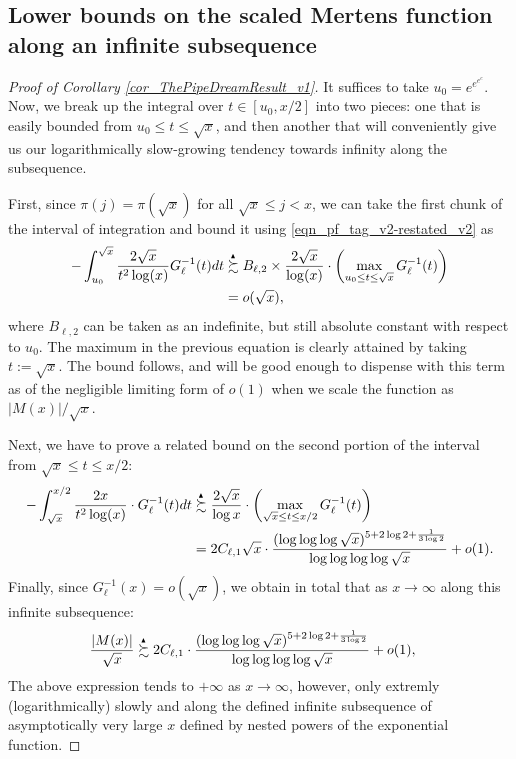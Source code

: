 \documentclass[11pt,reqno,a4letter]{article}
\numberwithin{figure}{section}
\numberwithin{table}{section}
\theoremstyle{plain}
\numberwithin{theorem}{section}
\theoremstyle{definition}
\newcommand{\SuccSim}[0]{\overset{_{\scriptsize{\blacktriangle}}}{\succsim}}
\begin{document}
\subsection{Lower bounds on the scaled Mertens function along an infinite subsequence}
\label{subSection_TheCoreResultProof} 

\begin{proof}[Proof of Corollary \ref{cor_ThePipeDreamResult_v1}] 
It suffices to take $u_0 = e^{e^{e^{e}}}$. 
Now, we break up the integral over $t \in [u_0, x/2]$ into two pieces: one that is easily bounded 
from $u_0 \leq t \leq \sqrt{x}$, 
and then another that will conveniently give us our logarithmically slow-growing tendency towards 
infinity along the subsequence. 

First, since $\pi(j) = \pi(\sqrt{x})$ for all $\sqrt{x} \leq j < x$, we can take the first chunk 
of the interval of integration and bound it using \eqref{eqn_pf_tag_v2-restated_v2} as 
\begin{align*} 
-\int_{u_0}^{\sqrt{x}} \frac{2\sqrt{x}}{t^2 \log(x)} G_{\ell}^{-1}(t) dt & \SuccSim 
     B_{\ell,2} \times \frac{2\sqrt{x}}{\log(x)} \cdot \left(\max\limits_{u_0 \leq t \leq \sqrt{x}} 
     G_{\ell}^{-1}(t)\right) \\ 
     & = o(\sqrt{x}), 
\end{align*} 
where $B_{\ell,2}$ can be taken as an indefinite, but still absolute constant with respect to $u_0$. 
The maximum in the previous equation is clearly attained by taking $t := \sqrt{x}$. 
The bound follows, and will be good enough to dispense with this term as of the 
negligible limiting form of $o(1)$ 
when we scale the function as $|M(x)| / \sqrt{x}$. 

Next, we have to prove a related bound on the second portion of the interval from 
$\sqrt{x} \leq t \leq x/2$: 
\begin{align*} 
-\int_{\sqrt{x}}^{x/2} \frac{2 x}{t^2 \log(x)} \cdot G_{\ell}^{-1}(t) dt & \SuccSim 
     \frac{2\sqrt{x}}{\log x} \cdot \left(\max_{\sqrt{x} \leq t \leq x/2} G_{\ell}^{-1}(t)\right) \\ 
     & = 2C_{\ell,1} \sqrt{x} \cdot 
     \frac{(\log\log\log \sqrt{x})^{5 + 2\log 2 + \frac{1}{3\log 2}}}{\log\log\log\log \sqrt{x}} + o(1). 
\end{align*} 
Finally, since $G_{\ell}^{-1}(x) = o(\sqrt{x})$, we obtain in total that as 
$x \rightarrow \infty$ along this infinite subsequence: 
\begin{align*} 
\frac{|M(x)|}{\sqrt{x}} & \SuccSim 
     2C_{\ell,1} \cdot 
     \frac{(\log\log\log \sqrt{x})^{5 + 2\log 2 + \frac{1}{3\log 2}}}{\log\log\log\log \sqrt{x}} + o(1), 
\end{align*} 
The above expression tends to $+\infty$ as $x \rightarrow \infty$, however, only 
extremly (logarithmically) slowly and along the defined infinite subsequence of 
asymptotically very large $x$ defined by nested powers of the exponential function. 
\end{proof} 
\end{document}
